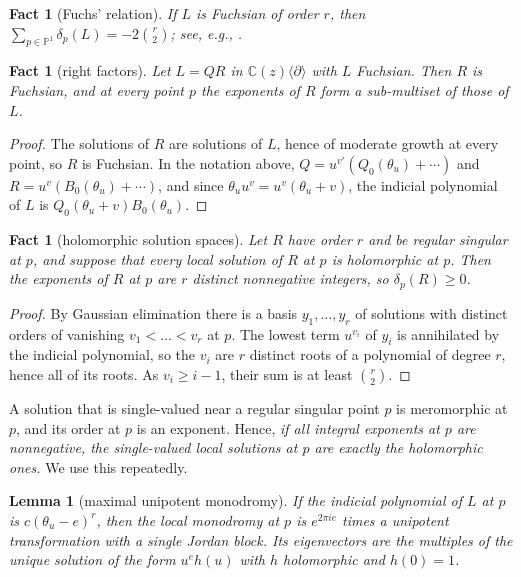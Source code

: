 \documentclass[11pt]{amsart}
\newtheorem{lemma}[thm]{Lemma}
\newtheorem{fact}[thm]{Fact}
\theoremstyle{definition}
\newcommand{\C}{\mathbb C}
\newcommand{\PP}{\mathbb P}
\begin{document}
\begin{fact}[Fuchs' relation]\label{fact:fuchs}
If $L$ is Fuchsian of order $r$, then $\sum_{p\in\PP^1}\delta_p(L)=-2\binom r2$; see, e.g., \cite{Inc56,Har20}.
\end{fact}

\begin{fact}[right factors]\label{fact:factor}
Let $L=QR$ in $\C(z)\langle\partial\rangle$ with $L$ Fuchsian. Then $R$ is Fuchsian, and at every point $p$ the exponents of $R$ form a sub-multiset of those of $L$.
\end{fact}

\begin{proof}
The solutions of $R$ are solutions of $L$, hence of moderate growth at every point, so $R$ is Fuchsian. In the notation above, $Q=u^{v'}(Q_0(\theta_u)+\cdots)$ and $R=u^{v}(B_0(\theta_u)+\cdots)$, and since $\theta_uu^v=u^v(\theta_u+v)$, the indicial polynomial of $L$ is $Q_0(\theta_u+v)B_0(\theta_u)$.
\end{proof}

\begin{fact}[holomorphic solution spaces]\label{fact:holo}
Let $R$ have order $r$ and be regular singular at $p$, and suppose that every local solution of $R$ at $p$ is holomorphic at $p$. Then the exponents of $R$ at $p$ are $r$ distinct nonnegative integers, so $\delta_p(R)\ge0$.
\end{fact}

\begin{proof}
By Gaussian elimination there is a basis $y_1,\dots,y_r$ of solutions with distinct orders of vanishing $v_1<\dots<v_r$ at $p$. The lowest term $u^{v_i}$ of $y_i$ is annihilated by the indicial polynomial, so the $v_i$ are $r$ distinct roots of a polynomial of degree $r$, hence all of its roots. As $v_i\ge i-1$, their sum is at least $\binom r2$.
\end{proof}

A solution that is single-valued near a regular singular point $p$ is meromorphic at $p$, and its order at $p$ is an exponent. Hence, \emph{if all integral exponents at $p$ are nonnegative, the single-valued local solutions at $p$ are exactly the holomorphic ones.} We use this repeatedly.

\begin{lemma}[maximal unipotent monodromy]\label{lem:mum}
If the indicial polynomial of $L$ at $p$ is $c(\theta_u-e)^r$, then the local monodromy at $p$ is $e^{2\pi ie}$ times a unipotent transformation with a single Jordan block. Its eigenvectors are the multiples of the unique solution of the form $u^e h(u)$ with $h$ holomorphic and $h(0)=1$.
\end{lemma}
\end{document}
